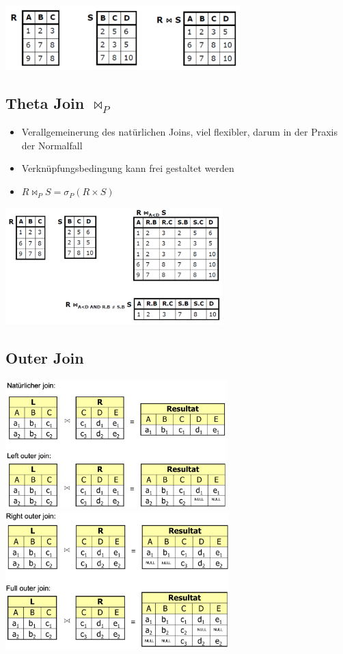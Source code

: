 \documentclass[8pt,a4paper]{scrartcl}
\begin{document}
\begin{multicols*}{3}
				\includegraphics[height=2.5cm]{img/njoin.png}
				
				
			\subsection{Theta Join $\bowtie_{P}$}
				\begin{itemize}\itemsep0pt			
					\item Verallgemeinerung des natürlichen Joins, viel flexibler, darum in der Praxis der Normalfall 
					\item Verknüpfungsbedingung kann frei gestaltet werden
					\item $R \bowtie_{P} S = \sigma_{P}(R \times S)$
				\end{itemize}

				\includegraphics[height=4.5cm]{img/tjoin.png} 	
				
			\subsection{Outer Join}
				\includegraphics[height=5cm]{img/ojoin1.png}
				\includegraphics[height=5.25cm]{img/ojoin2.png} 	
		

\end{multicols*}
\end{document}
